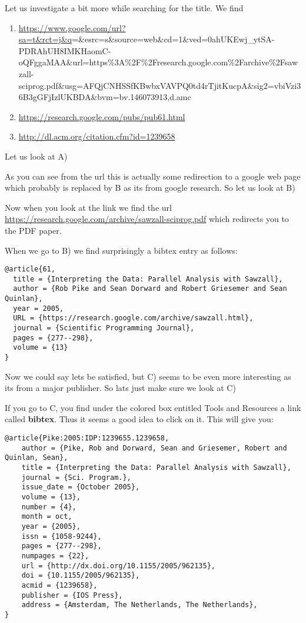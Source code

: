 Let us investigate a bit more while searching for the title. We find

\begin{enumerate}
\def\labelenumi{\Alph{enumi})}
\tightlist
\item
  \url{https://www.google.com/url?sa=t\&rct=j\&q}=\&esrc=s\&source=web\&cd=1\&ved=0ahUKEwj\_ytSA-PDRAhUH8IMKHaomC-oQFggaMAA\&url=https\%3A\%2F\%2Fresearch.google.com\%2Farchive\%2Fsawzall-sciprog.pdf\&usg=AFQjCNHSSfKBwbxVAVPQ0td4rTjitKucpA\&sig2=vbiVzi36B3gGFjIzlUKBDA\&bvm=bv.146073913,d.amc
\item
  \url{https://research.google.com/pubs/pub61.html}
\item
  \url{http://dl.acm.org/citation.cfm?id=1239658}
\end{enumerate}

Let us look at A)

As you can see from the url this is actually some redirection to a google
web page which probably is replaced by B as its from google research. So
let us look at B)

Now when you look at the link we find the url
\url{https://research.google.com/archive/sawzall-sciprog.pdf} which
redirects you to the PDF paper.

When we go to B) we find surprisingly a bibtex entry as follows:

\begin{verbatim}
@article{61,
  title = {Interpreting the Data: Parallel Analysis with Sawzall},
  author = {Rob Pike and Sean Dorward and Robert Griesemer and Sean Quinlan},
  year = 2005,
  URL = {https://research.google.com/archive/sawzall.html},
  journal = {Scientific Programming Journal},
  pages = {277--298},
  volume = {13}
}
\end{verbatim}

Now we could say lets be satisfied, but C) seems to be even more
interesting as its from a major publisher. So lats just make sure we
look at C)

If you go to C, you find under the colored box entitled Tools and
Resources a link called \textbf{bibtex}. Thus it seems a good idea to
click on it. This will give you:

\begin{verbatim}
@article{Pike:2005:IDP:1239655.1239658,
    author = {Pike, Rob and Dorward, Sean and Griesemer, Robert and Quinlan, Sean},
    title = {Interpreting the Data: Parallel Analysis with Sawzall},
    journal = {Sci. Program.},
    issue_date = {October 2005},
    volume = {13},
    number = {4},
    month = oct,
    year = {2005},
    issn = {1058-9244},
    pages = {277--298},
    numpages = {22},
    url = {http://dx.doi.org/10.1155/2005/962135},
    doi = {10.1155/2005/962135},
    acmid = {1239658},
    publisher = {IOS Press},
    address = {Amsterdam, The Netherlands, The Netherlands},
}
\end{verbatim}

